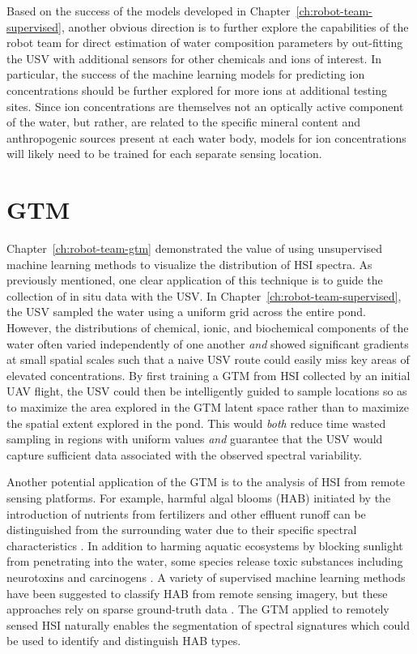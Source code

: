 Based on the success of the models developed in
Chapter~\ref{ch:robot-team-supervised}, another obvious direction is to further
explore the capabilities of the robot team for direct estimation of water
composition parameters by out-fitting the USV with additional sensors for other
chemicals and ions of interest. In particular, the success of the machine
learning models for predicting ion concentrations should be further explored for
more ions at additional testing sites. Since ion concentrations are themselves not
an optically active component of the water, but rather, are related to the
specific mineral content and anthropogenic sources present at each water body,
models for ion concentrations will likely need to be trained for each separate
sensing location.

\section{GTM}

Chapter~\ref{ch:robot-team-gtm} demonstrated the value of using unsupervised
machine learning methods to visualize the distribution of HSI spectra. As
previously mentioned, one clear application of this technique is to guide the
collection of in situ data with the USV. In
Chapter~\ref{ch:robot-team-supervised}, the USV sampled the water using a
uniform grid across the entire pond. However, the distributions of chemical,
ionic, and biochemical components of the water often varied independently of one
another \textit{and} showed significant gradients at small spatial scales such
that a naive USV route could easily miss key areas of elevated concentrations.
By first training a GTM from HSI collected by an initial UAV flight, the USV
could then be intelligently guided to sample locations so as to maximize the
area explored in the GTM latent space rather than to maximize the spatial extent
explored in the pond. This would \textit{both} reduce time wasted sampling in
regions with uniform values \textit{and} guarantee that the USV would capture
sufficient data associated with the observed spectral variability.

Another potential application of the GTM is to the analysis of HSI from remote
sensing platforms. For example, harmful algal blooms (HAB) initiated by the
introduction of nutrients from fertilizers and other effluent runoff can be
distinguished from the surrounding water due to their specific spectral
characteristics \cite{algal-blooms-rs}. In addition to harming aquatic
ecosystems by blocking sunlight from penetrating into the water, some species
release toxic substances including neurotoxins and carcinogens
\cite{hab-toxins}. A variety of supervised machine learning methods have been
suggested to classify HAB from remote sensing imagery, but these approaches rely
on sparse ground-truth data \cite{hab-ml}. The GTM applied to remotely sensed HSI
naturally enables the segmentation of spectral signatures which could be used to
identify and distinguish HAB types.


